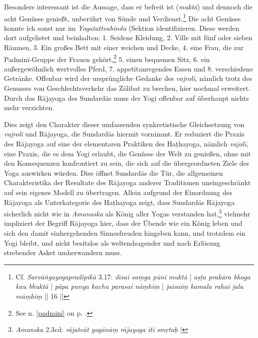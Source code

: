 Besonders interessant ist die Aussage, dass er befreit ist (\textit{muktā}) und dennoch die acht Genüsse genießt, unberührt von Sünde und Verdienst.\footnote{Cf. \emph{Sarvāṅgayogapradīpikā} 3.17: \textit{dīsai saṃga pūni muktā} | \textit{aṣṭa prakāra bhoga kau bhuktā} | \textit{pāpa punya kachu parasai nāṃhīṃ} | \textit{jaisaiṃ kamala rahai jala māṃhīṃ} || 16 ||} Die acht Genüsse konnte ich sonst nur im \textit{Yogatattvabindu} (Sektion  identifizieren. Diese werden dort aufgelistet und beinhalten: 1. Seidene Kleidung, 2. Ville mit fünf oder sieben Räumen, 3. Ein großes Bett mit einer weichen und Decke, 4. eine Frau, die zur Padminī-Gruppe der Frauen gehört,\footnote{See n. \cref{padmini} on p. .} 5. einen bequemen Sitz, 6. ein außergewöhnlich wertvolles Pferd, 7. appetitanregendes Essen und 8. verschiedene Getränke. Offenbar wird der ursprüngliche Gedanke des \textit{vajrolī}, nämlich trotz des Genusses von Geschlechtsverkehr das Zölibat zu brechen, hier nochmal erweitert. Durch das Rājayoga des Sundardās muss der Yogi offenbar auf überhaupt nichts mehr verzichten.

Dies zeigt den Charakter dieser umfassenden synkretistische Gleichsetzung von \textit{vajrolī} und Rājayoga, die Sundardās hiermit vornimmt. Er reduziert die Praxis des Rājayoga auf eine der elementaren Praktiken des Haṭhayoga, nämlich \textit{vajolī}, eine Praxis, die es dem Yogi erlaubt, die Genüsse der Welt zu genießen, ohne mit den Konsequenzen konfrontiert zu sein, die sich auf die übergeordneten Ziele des Yoga auswirken würden. Dies öffnet Sundardās die Tür, die allgemeinen Charakteristika der Resultate des Rājayoga anderer Traditionen uneingeschränkt auf sein eigenes Modell zu übertragen. Allein aufgrund der Einordnung des Rājayoga als Unterkategorie des Haṭhayoga zeigt, dass Sundardās Rājayoga sicherlich nicht wie in \textit{Amanaska} als König aller Yogas verstanden hat,\footnote{\textit{Amanska} 2.3cd: \textit{rājatvāt yogānāṃ rājayoga iti smṛtaḥ} |} vielmehr impliziert der Begriff Rājayoga hier, dass der Übende wie ein König leben und sich den damit einhergehenden Sinnesfreuden hingeben kann, und trotzdem ein Yogi bleibt, und nicht besitzlos als weltendsagender und nach Erlösung strebender Asket umherwandern muss. 

%
%


